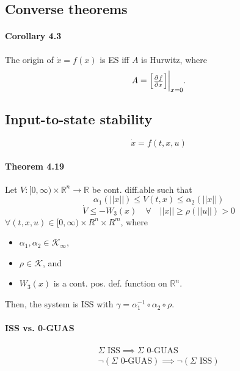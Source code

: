 \subsection{Converse theorems}
\paragraph{Corollary 4.3}
The origin of $\dot{x} = f(x)$ is ES iff $A$ is Hurwitz, where
\begin{equation}
	A =
	\begin{bmatrix}
		\pd{f}{x}
	\end{bmatrix}
	\evalat{x=0}
	.
\end{equation}

\subsection{Input-to-state stability}
\begin{equation}\label{eq:iss-system}
	\dot{x} = f(t,x,u)
\end{equation}

\paragraph{Theorem 4.19}
Let $V : [0,\infty) \times \mathbb{R}^n \to \mathbb{R}$ be cont. diff.able such that
\begin{equation}
	\alpha_1 \left( ||x|| \right) \leq V(t,x) \leq \alpha_2 \left( ||x|| \right)
\end{equation}
\begin{equation}
	\dot{V} \leq -W_3(x) \quad \forall \quad ||x|| \geq \rho \left( ||u|| \right) > 0
\end{equation}
$\forall (t,x,u) \in [0,\infty) \times R^n \times R^m$, where
\begin{itemize}
	\item $\alpha_1, \alpha_2 \in \mathcal{K}_\infty$,
	\item $\rho \in \mathcal{K}$, and
	\item $W_3(x)$ is a cont. pos. def. function on $\mathbb{R}^n$.
\end{itemize}
Then, the system is ISS with $\gamma=\alpha_1^{-1} \circ \alpha_2 \circ \rho$.

\paragraph{ISS vs. 0-GUAS}
\begin{gather}
	\Sigma \mbox{ ISS} \implies \Sigma \mbox{ 0-GUAS} \\
	\neg (\Sigma \mbox{ 0-GUAS}) \implies \neg (\Sigma \mbox{ ISS})
\end{gather}

